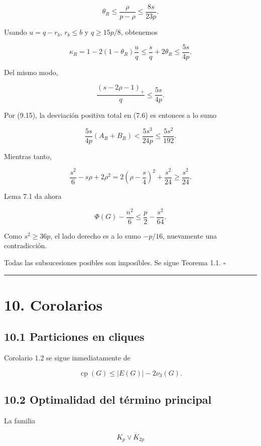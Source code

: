 \documentclass[
  11pt,
]{article}
\begin{document}
\[
\theta_R
\le
\frac{\rho}{p-\rho}
\le
\frac{8s}{23p}.
\]

Usando \(u=q-r_b\), \(r_b\le b\) y \(q\ge15p/8\), obtenemos

\[
\kappa_R
=1-2(1-\theta_R)\frac uq
\le
\frac sq+2\theta_R
\le
\frac{5s}{4p}.
\tag{9.16}
\]

Del mismo modo,

\[
\frac{(s-2\rho-1)_+}{q}
\le
\frac{5s}{4p}.
\tag{9.17}
\]

Por (9.15), la desviación positiva total en (7.6) es entonces a lo sumo

\[
\frac{5s}{4p}(A_R+B_R)
<
\frac{5s^3}{24p}
\le
\frac{5s^2}{192}.
\tag{9.18}
\]

Mientras tanto,

\[
\frac{s^2}{6}-s\rho+2\rho^2
=
2\left(\rho-\frac s4\right)^2+\frac{s^2}{24}
\ge
\frac{s^2}{24}.
\tag{9.19}
\]

Lema 7.1 da ahora

\[
\Phi(G)-\frac{n^2}{6}
\le
\frac p2-\frac{s^2}{64}.
\tag{9.20}
\]

Como \(s^2\ge36p\), el lado derecho es a lo sumo \(-p/16\), nuevamente una contradicción.

Todas las subsucesiones posibles son imposibles. Se sigue Teorema 1.1. \(\square\)

\begin{center}\rule{0.5\linewidth}{0.5pt}\end{center}

\section{10. Corolarios}\label{corolarios}

\subsection{10.1 Particiones en cliques}\label{particiones-en-cliques}

Corolario 1.2 se sigue inmediatamente de

\[
\operatorname{cp}(G)
\le
|E(G)|-2\nu_3(G).
\]

\subsection{10.2 Optimalidad del término principal}\label{optimalidad-del-tuxe9rmino-principal}

La familia

\[
K_p\vee\overline K_{2p}
\]
\end{document}
